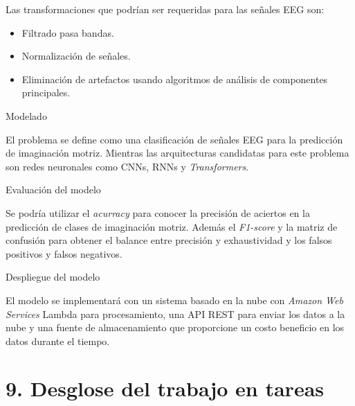\documentclass[
11pt, %
]{charter}
\begin{document}
Las transformaciones que podrían ser requeridas para las señales EEG son:
\begin{itemize}
	\item Filtrado pasa bandas.
	\item Normalización de señales.
	\item Eliminación de artefactos usando algoritmos de análisis de componentes principales.
\end{itemize}

Modelado

El problema se define como una clasificación de señales EEG para la predicción de imaginación motriz.
Mientras las arquitecturas candidatas para este problema son redes neuronales como CNNs, RNNs y \textit{Transformers}.

Evaluación del modelo

Se podría utilizar el \textit{acurracy} para conocer la precisión de aciertos en la predicción de clases de imaginación motriz. Además el \textit{F1-score} y la matriz de confusión para obtener
el balance entre precisión y exhaustividad y los falsos positivos y falsos negativos. 

Despliegue del modelo

El modelo se implementará con un sistema basado en la nube con \textit{Amazon Web Services} Lambda para procesamiento, una API REST para enviar los datos a la nube y una fuente
de almacenamiento que proporcione un costo beneficio en los datos durante el tiempo.

\section{9. Desglose del trabajo en tareas}
\label{sec:wbs}
\end{document}
